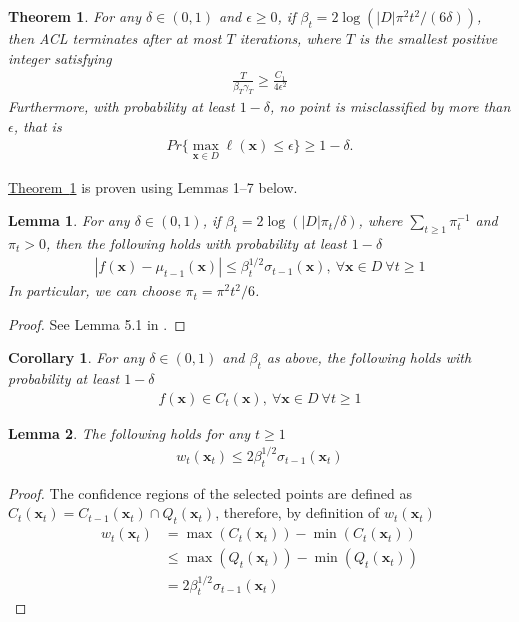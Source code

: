 \documentclass{article}
\def\*#1{\bm{#1}}
\newcommand{\theoremref}[1]{\hyperref[#1]{\mbox{Theorem~\ref*{#1}}}}
\newtheorem{theorem}{Theorem}
\newtheorem{lemma}{Lemma}
\newtheorem{cor}{Corollary}
\begin{document}
\begin{theorem}
\label{thm:acl}
For any $\delta \in (0, 1)$ and $\epsilon \geq 0$,
if $\beta_t = 2\log(|D|\pi^2 t^2/(6\delta))$, then ACL terminates after
at most $T$ iterations, where $T$ is the smallest positive integer
satisfying
\begin{align*}
\frac{T}{\beta_T \gamma_T} \geq \frac{C_1}{4\epsilon^2}
\end{align*}
Furthermore, with probability at least $1-\delta$, no point is
misclassified by more than $\epsilon$, that is
\begin{align*}
Pr\{\max_{\*x\in D}\ell(\*x) \leq \epsilon\} \geq 1 - \delta.
\end{align*}
\end{theorem}

\theoremref{thm:acl} is proven using Lemmas 1--7 below.

\begin{lemma}
\label{lem:srin1}
For any $\delta \in (0, 1)$, if $\beta_t = 2\log(|D|\pi_t/\delta)$, where
$\sum_{t\geq1}\pi_t^{-1}$ and $\pi_t > 0$, then the following holds with
probability at least $1-\delta$
\begin{align*}
|f(\*x) - \mu_{t-1}(\*x)| \leq \beta_t^{1/2}\sigma_{t-1}(\*x),\ \forall \*x \in D\ \forall t \geq 1
\end{align*}
In particular, we can choose $\pi_t = \pi^2 t^2/6$.
\end{lemma}
\begin{proof}
See Lemma 5.1 in \cite{srinivas2010}.
\end{proof}

\begin{cor}
\label{cor:cs}
For any $\delta \in (0, 1)$ and $\beta_t$ as above, the following holds
with probability at least $1-\delta$
\begin{align*}
f(\*x) \in C_t(\*x),\ \forall \*x \in D\ \forall t \geq 1
\end{align*}
\end{cor}

\begin{lemma}
\label{lem:wb}
The following holds for any $t \geq 1$
\begin{align*}
w_t(\*x_t) \leq 2\beta_t^{1/2}\sigma_{t-1}(\*x_t)
\end{align*}
\end{lemma}
\begin{proof}
The confidence regions of the selected points are defined as
$C_t(\*x_t) = C_{t-1}(\*x_t) \cap Q_t(\*x_t)$, therefore, by
definition of $w_t(\*x_t)$
\begin{align*}
w_t(\*x_t) &= \max(C_t(\*x_t)) - \min(C_t(\*x_t))\\
&\leq \max(Q_t(\*x_t)) - \min(Q_t(\*x_t))\\
&=2\beta_t^{1/2}\sigma_{t-1}(\*x_t)
\end{align*}
\end{proof}
\end{document}
